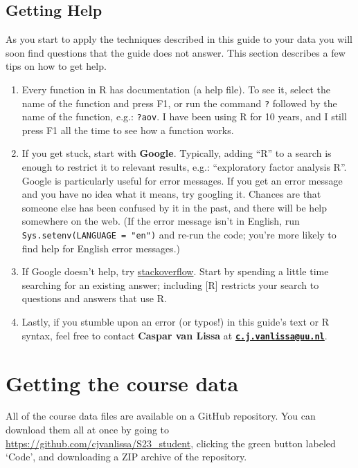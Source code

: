 \documentclass[
]{book}
\providecommand{\tightlist}{%
  \setlength{\itemsep}{0pt}\setlength{\parskip}{0pt}}
\begin{document}
\hypertarget{getting-help}{%
\subsection{Getting Help}\label{getting-help}}

As you start to apply the techniques described in this guide to your data you will soon find questions that the guide does not answer. This section describes a few tips on how to get help.

\begin{enumerate}
\def\labelenumi{\arabic{enumi}.}
\tightlist
\item
  Every function in R has documentation (a help file). To see it, select the name of the function and press F1, or run the command \texttt{?} followed by the name of the function, e.g.: \texttt{?aov}. I have been using R for 10 years, and I still press F1 all the time to see how a function works.
\item
  If you get stuck, start with \textbf{Google}. Typically, adding ``R'' to a search is enough to restrict it to relevant results, e.g.: ``exploratory factor analysis R''. Google is particularly useful for error messages. If you get an error message and you have no idea what it means, try googling it. Chances are that someone else has been confused by it in the past, and there will be help somewhere on the web. (If the error message isn't in English,
  run \texttt{Sys.setenv(LANGUAGE\ =\ "en")} and re-run the code; you're
  more likely to find help for English error messages.)
\item
  If Google doesn't help, try \href{https://stackoverflow.com}{stackoverflow}. Start by spending a little time searching for an existing answer; including {[}R{]} restricts your search to questions and answers that use R.
\item
  Lastly, if you stumble upon an error (or typos!) in this guide's text or R syntax, feel free to contact \textbf{Caspar van Lissa} at \textbf{\href{mailto:c.j.vanlissa@uu.nl}{\nolinkurl{c.j.vanlissa@uu.nl}}}.
\end{enumerate}

\hypertarget{getting-the-course-data}{%
\section{Getting the course data}\label{getting-the-course-data}}

All of the course data files are available on a GitHub repository. You can download them all at once by going to \url{https://github.com/cjvanlissa/S23_student}, clicking the green button labeled `Code', and downloading a ZIP archive of the repository.
\end{document}

